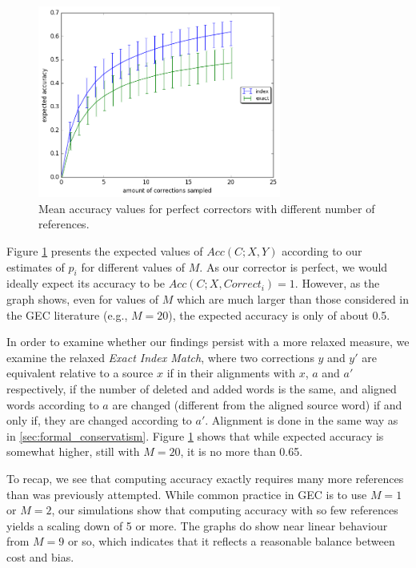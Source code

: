 \documentclass[letter,11pt]{article}
\begin{document}
		\begin{figure}
			\includegraphics[width=8cm]{repeat_1000_accuracy}
			\caption{Mean accuracy values for perfect correctors with different number of references.} \label{fig:accuracy_vals}
		\end{figure}
		
		Figure \ref{fig:accuracy_vals} presents the expected values of $Acc(C;X,Y)$ according to our estimates of $p_i$ for
		different values of $M$. As our corrector is perfect, we would ideally expect its accuracy to be
		$Acc(C;X,Correct_i) = 1$. However, as the graph shows, even for values of $M$ which are much larger than
		those considered in the GEC literature (e.g., $M=20$), the expected accuracy is only of about 0.5.
		
		In order to examine whether our findings persist with a more relaxed measure, we examine the relaxed
		{\it Exact Index Match}, where two corrections $y$ and $y'$
		are equivalent relative to a source $x$ if in their alignments with $x$, $a$ and $a'$ respectively,
		if the number of deleted and added words is the same, and aligned words according to $a$ are
		changed (different from the aligned source word) if and only if, they are changed according to $a'$. Alignment is done in the same way as in \ref{sec:formal_conservatism}. Figure \ref{fig:accuracy_vals}
		shows that while expected accuracy is somewhat higher, still with $M=20$, it is no more than 0.65.
		
		To recap, we see that computing accuracy exactly requires many more references than was previously attempted.
		While common practice in GEC is to use $M=1$ or $M=2$, our simulations show that computing accuracy with
		so few references yields a scaling down of 5 or more. The graphs do show near linear behaviour from $M=9$ or
		so, which indicates that it reflects a reasonable balance between cost and bias.
		
\end{document}
